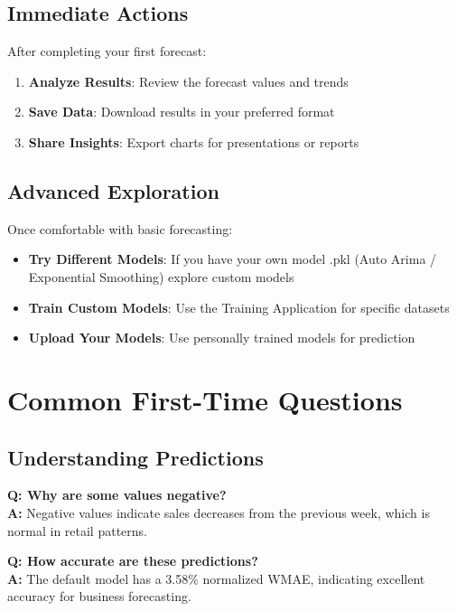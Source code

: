 \subsection{Immediate Actions}

After completing your first forecast:

\begin{enumerate}
	\item \textbf{Analyze Results}: Review the forecast values and trends
	\item \textbf{Save Data}: Download results in your preferred format
	\item \textbf{Share Insights}: Export charts for presentations or reports
\end{enumerate}

\subsection{Advanced Exploration}

Once comfortable with basic forecasting:

\begin{itemize}
	\item \textbf{Try Different Models}: If you have your own model .pkl (Auto Arima / Exponential Smoothing) explore custom models
	\item \textbf{Train Custom Models}: Use the Training Application for specific datasets
	\item \textbf{Upload Your Models}: Use personally trained models for prediction
\end{itemize}

\section{Common First-Time Questions}

\subsection{Understanding Predictions}

\textbf{Q: Why are some values negative?}\\
\textbf{A:} Negative values indicate sales decreases from the previous week, which is normal in retail patterns.

\textbf{Q: How accurate are these predictions?}\\
\textbf{A:} The default model has a 3.58\% normalized WMAE, indicating excellent accuracy for business forecasting.

